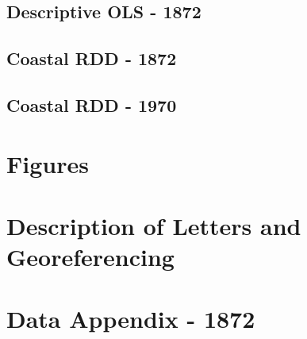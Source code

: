 \documentclass{article}
\begin{document}


\clearpage

\subsection{Descriptive OLS - 1872}



\clearpage



\clearpage

\subsection{Coastal RDD - 1872}

\clearpage

\subsection{Coastal RDD - 1970}


\clearpage

\appendix

\setcounter{figure}{0}  
\setcounter{table}{0}  

\renewcommand{\thefigure}{A.\arabic{figure}}
\renewcommand{\thetable}{A.\arabic{table}}

\section{Figures}

\clearpage

\section{Description of Letters and Georeferencing}
\label{app:appendix_data}
\clearpage

\section{Data Appendix - 1872}
\label{app:variable_construction_1872}
\end{document}

